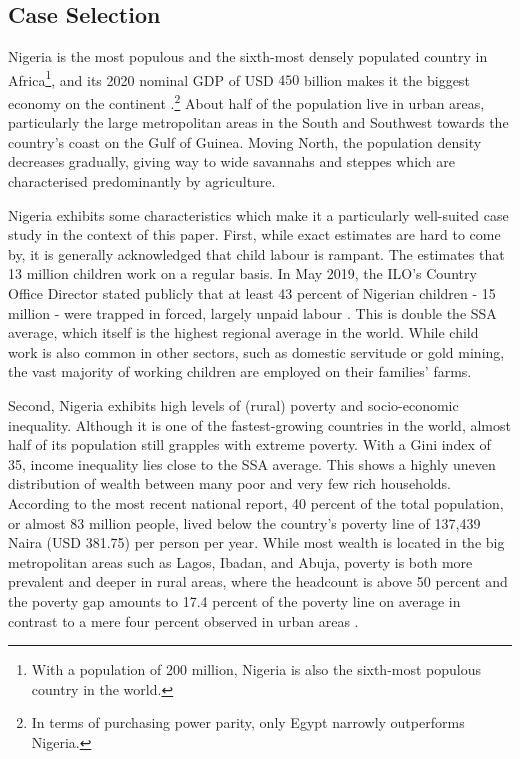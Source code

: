 \documentclass[a4paper,12pt]{article}
\theoremstyle{plain}
\theoremstyle{definition}
\theoremstyle{definition}
\theoremstyle{definition}
\theoremstyle{definition}
\begin{document}
\subsection{Case Selection}
\label{sub:case_selection}

Nigeria is the most populous and the sixth-most densely populated country in Africa\footnote{With a population of 200 million, Nigeria is also the sixth-most populous country in the world.}, and its 2020 nominal GDP of USD $450$ billion makes it the biggest economy on the continent \citep{WorldBank2021}.\footnote{In terms of purchasing power parity, only Egypt narrowly outperforms Nigeria.} About half of the population live in urban areas, particularly the large metropolitan areas in the South and Southwest towards the country's coast on the Gulf of Guinea. Moving North, the population density decreases gradually, giving way to wide savannahs and steppes which are characterised predominantly by agriculture.

Nigeria exhibits some characteristics which make it a particularly well-suited case study in the context of this paper. First, while exact estimates are hard to come by, it is generally acknowledged that child labour is rampant. The \citet{USDepartmentofLabor2021} estimates that 13 million children work on a regular basis. In May 2019, the ILO's Country Office Director stated publicly that at least 43 percent of Nigerian children - 15 million - were trapped in forced, largely unpaid labour \citep{ILO2019}. This is double the SSA average, which itself is the highest regional average in the world. While child work is also common in other sectors, such as domestic servitude or gold mining, the vast majority of working children are employed on their families' farms.

Second, Nigeria exhibits high levels of (rural) poverty and socio-economic inequality. Although it is one of the fastest-growing countries in the world, almost half of its population still grapples with extreme poverty. With a Gini index of 35, income inequality lies close to the SSA average. This shows a highly uneven distribution of wealth between many poor and very few rich households. According to the most recent national report, 40 percent of the total population, or almost 83 million people, lived below the country's poverty line of 137,439 Naira (USD 381.75) per person per year. While most wealth is located in the big metropolitan areas such as Lagos, Ibadan, and Abuja, poverty is both more prevalent and deeper in rural areas, where the headcount is above 50 percent and the poverty gap amounts to 17.4 percent of the poverty line on average in contrast to a mere four percent observed in urban areas \citep{NBS2020}.
\end{document}
